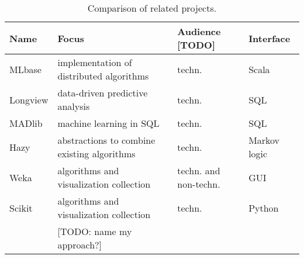 \begin{table}[t]
\centering
\begin{tabular}{llll} %
\textbf{Name} & \textbf{Focus} & \textbf{Audience} [TODO] & \textbf{Interface}\\
\hline
MLbase & implementation of distributed algorithms & techn. & Scala\\
Longview & data-driven predictive analysis & techn. & SQL\\
MADlib & machine learning in SQL & techn. & SQL\\
Hazy & abstractions to combine existing algorithms & techn. & Markov logic\\
Weka & algorithms and visualization collection & techn. and non-techn. & GUI\\
Scikit & algorithms and visualization collection & techn. & Python\\
& [TODO: name my approach?]
\end{tabular}
\caption[Comparison of related projects]{Comparison of related projects.}\label{tab:related_work}
\end{table}
